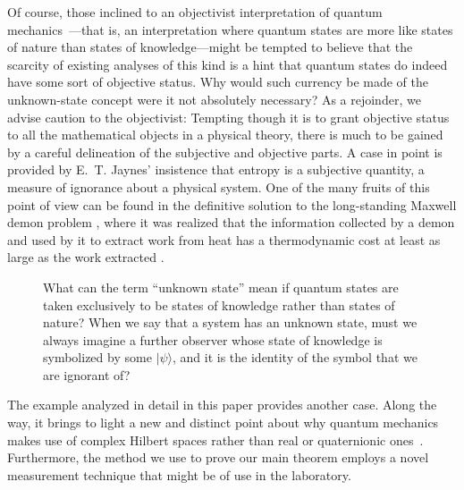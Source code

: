 Of course, those inclined to an objectivist interpretation of
quantum mechanics~\cite{Goldstein98}---that is, an interpretation
where quantum states are more like states of nature than states of
knowledge---might be tempted to believe that the scarcity of
existing analyses of this kind is a hint that quantum states do
indeed have some sort of objective status.  Why would such currency
be made of the unknown-state concept were it not absolutely
necessary?  As a rejoinder, we advise caution to the objectivist:
Tempting though it is to grant objective status to all the
mathematical objects in a physical theory, there is much to be
gained by a careful delineation of the subjective and objective
parts. A case in point is provided by E.~T. Jaynes'
\cite{Jaynes1957a,Jaynes1957b,Jaynes1983} insistence that entropy is
a subjective quantity, a measure of ignorance about a physical
system.  One of the many fruits of this point of view can be found in
the definitive solution \cite{Bennett1983} to the long-standing
Maxwell demon problem \cite{Leff1990}, where it was realized that the
information collected by a demon and used by it to extract work from
heat has a thermodynamic cost at least as large as the work extracted
\cite{Landauer1961}.

\begin{center}
\begin{figure} \leavevmode
\epsfxsize=8cm  \bigskip\caption{What can the term
``unknown state'' mean if quantum states are taken exclusively to be
states of knowledge rather than states of nature?  When we say that
a system has an unknown state, must we always imagine a further
observer whose state of knowledge is symbolized by some
$|\psi\rangle$, and it is the identity of the symbol that we are
ignorant of?}
\end{figure}
\end{center}

The example analyzed in detail in this paper provides another case.
Along the way, it brings to light a new and distinct point about why
quantum mechanics makes use of complex Hilbert spaces rather than
real or quaternionic
ones~\cite{Stueckelberg1960,Adler1995,Araki1980,Wootters1990}.
Furthermore, the method we use to prove our main theorem employs a
novel measurement technique that might be of use in the laboratory.


